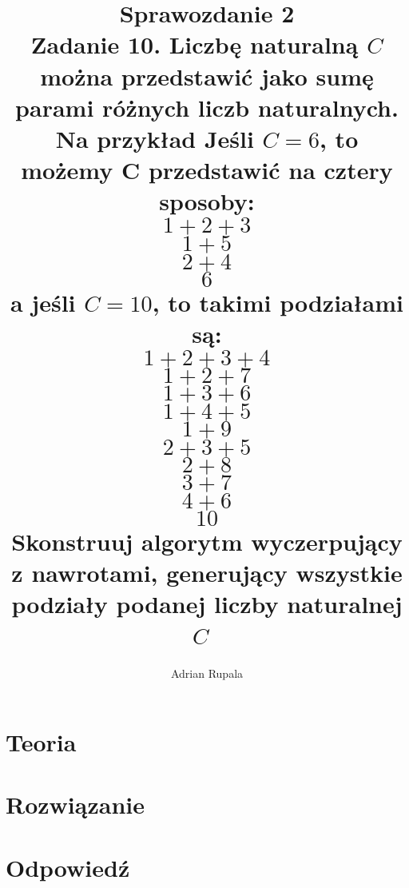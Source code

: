 \documentclass[UTF8]{article}
\title{%
	Sprawozdanie 2 \\
	\large Zadanie 10. Liczbę naturalną $C$ można przedstawić jako sumę parami różnych liczb naturalnych. Na przykład Jeśli $C = 6$, to możemy C przedstawić na cztery sposoby:
	\\$1+2+3$
	\\$1+5$
	\\$2+4$
	\\$6$
	\\a jeśli $C = 10$, to takimi podziałami są:
	\\$1+2+3+4$
	\\$1+2+7$
	\\$1+3+6$
	\\$1+4+5$
	\\$1+9$
	\\$2+3+5$
	\\$2+8$
	\\$3+7$
	\\$4+6$
	\\$10$
	\\Skonstruuj algorytm wyczerpujący z nawrotami, generujący wszystkie podziały podanej liczby naturalnej $C$~}
\author{Adrian Rupala}
\begin{document}
\maketitle

\newpage
\tableofcontents

\newpage
{}

\section{Teoria}

\section{Rozwiązanie}

\section{Odpowiedź}
\end{document}
